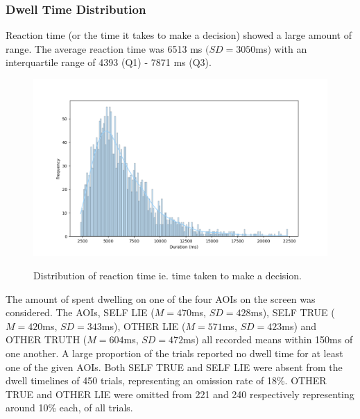 \documentclass[man, floatsintext]{apa7}
\begin{document}
\subsubsection{Dwell Time Distribution}

Reaction time (or the time it takes to make a decision) showed a large amount of range. The average reaction time was 6513 ms $(SD = 3050$ms$)$ with an interquartile range of 4393 (Q1) - 7871 ms (Q3).

\begin{figure}[H]
	\centering
	\includegraphics[width=0.75\linewidth]{../plots/Dwell/RTDistPlot.png}
	\label{fig:RTDistPlot}
	\caption{Distribution of reaction time ie. time taken to make a decision.}
\end{figure}

The amount of spent dwelling on one of the four AOIs on the screen was considered. The AOIs, SELF LIE ($M = 470$ms, $SD = 428$ms), SELF TRUE ($M = 420$ms, $SD = 343$ms), OTHER LIE ($M = 571$ms, $SD = 423$ms) and OTHER TRUTH ($M = 604$ms, $SD = 472$ms) all recorded means within 150ms of one another. A large proportion of the trials reported no dwell time for at least one of the given AOIs. Both SELF TRUE and SELF LIE were absent from the dwell timelines of 450 trials, representing an omission rate of 18\%. OTHER TRUE and OTHER LIE were omitted from 221 and 240 respectively representing around 10\% each, of all trials.
\end{document}
